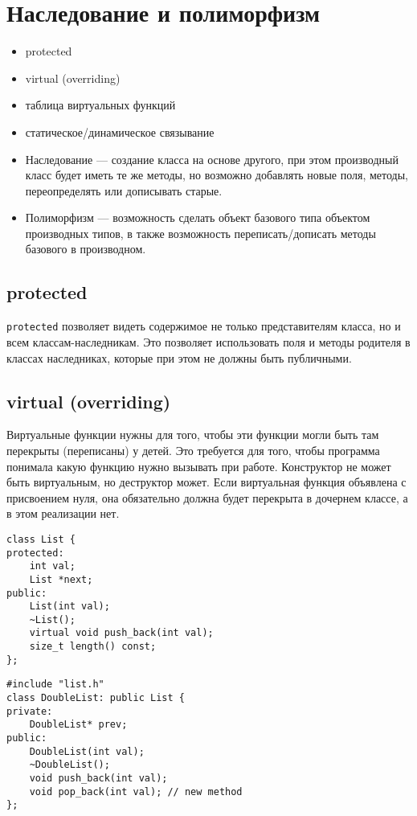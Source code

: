 \section{Наследование и полиморфизм}
\begin{itemize}[noitemsep]
    \item protected
    \item virtual (overriding)
    \item таблица виртуальных функций
    \item статическое/динамическое связывание
\end{itemize}
\begin{itemize}[noitemsep,label=$\to$]
    \item
Наследование --- создание класса на основе другого, при этом производный класс будет иметь те же методы, но возможно добавлять новые поля, методы, переопределять или дописывать старые.
\item
Полиморфизм --- возможность сделать объект базового типа объектом производных типов, в также возможность переписать/дописать методы базового в производном.
\end{itemize}
\subsection{protected}
{\tt protected} позволяет видеть содержимое не только представителям класса, но и всем классам-наследникам. Это позволяет использовать поля и методы родителя в классах наследниках, которые при этом не должны быть публичными.
\subsection{virtual (overriding)}
Виртуальные функции нужны для того, чтобы эти функции могли быть там перекрыты (переписаны) у детей. Это требуется для того, чтобы программа понимала какую функцию нужно вызывать при работе.
Конструктор не может быть виртуальным, но деструктор может.
Если виртуальная функция объявлена с присвоением нуля, она обязательно должна будет перекрыта в дочернем классе, а в этом реализации нет.

\begin{minipage}{0.4\textwidth}
\begin{verbatim}
class List {
protected:
    int val;
    List *next;
public:
    List(int val);
    ~List();
    virtual void push_back(int val);
    size_t length() const;
};
\end{verbatim}
\end{minipage}
\hfill
\begin{minipage}{0.5\textwidth}
\begin{verbatim}
#include "list.h"
class DoubleList: public List {
private:
    DoubleList* prev;
public:
    DoubleList(int val);
    ~DoubleList();
    void push_back(int val);
    void pop_back(int val); // new method
};
\end{verbatim}
\end{minipage}

